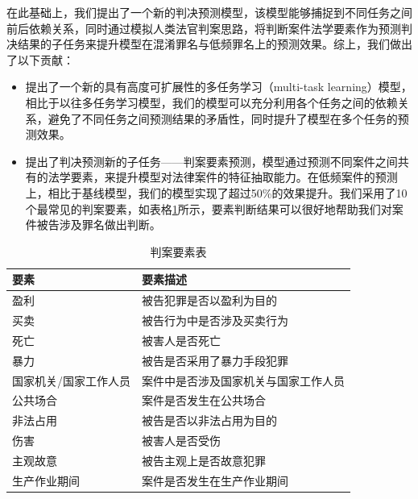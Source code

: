 在此基础上，我们提出了一个新的判决预测模型，该模型能够捕捉到不同任务之间前后依赖关系，同时通过模拟人类法官判案思路，将判断案件法学要素作为预测判决结果的子任务来提升模型在混淆罪名与低频罪名上的预测效果。综上，我们做出了以下贡献：

\begin{itemize}
	\item 提出了一个新的具有高度可扩展性的多任务学习（multi-task learning）模型，相比于以往多任务学习模型，我们的模型可以充分利用各个任务之间的依赖关系，避免了不同任务之间预测结果的矛盾性，同时提升了模型在多个任务的预测效果。
	\item 提出了判决预测新的子任务——判案要素预测，模型通过预测不同案件之间共有的法学要素，来提升模型对法律案件的特征抽取能力。在低频案件的预测上，相比于基线模型，我们的模型实现了超过50\%的效果提升。我们采用了10个最常见的判案要素，如表格\ref{tab:key_elements}所示，要素判断结果可以很好地帮助我们对案件被告涉及罪名做出判断。
	\end{itemize}

\begin{table}[]
\center
\begin{tabular}{l|l}
\hline
\textbf{要素}          & \textbf{要素描述}   \\ \hline
盈利          & 被告犯罪是否以盈利为目的       \\
买卖          & 被告行为中是否涉及买卖行为      \\
死亡          & 被害人是否死亡            \\
暴力          & 被告是否采用了暴力手段犯罪      \\
国家机关/国家工作人员 & 案件中是否涉及国家机关与国家工作人员 \\
公共场合        & 案件是否发生在公共场合        \\
非法占用        & 被告是否以非法占用为目的       \\
伤害          & 被害人是否受伤            \\
主观故意        & 被告主观上是否故意犯罪        \\
生产作业期间      & 案件是否发生在生产作业期间  \\ \hline   
\end{tabular}
\label{tab:key_elements}
\caption{判案要素表}
\end{table}




